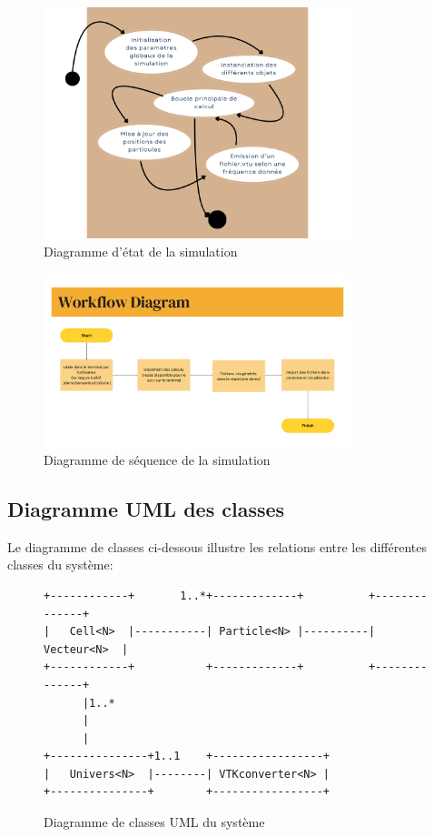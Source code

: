 \documentclass[12pt,a4paper]{article}
\begin{document}
\begin{figure}[H]
\centering
\includegraphics[width=0.8\textwidth]{assets/diagrammeEtatTransition.png}
\caption{Diagramme d'état de la simulation}
\end{figure}

\begin{figure}[H]
\centering
\includegraphics[width=0.8\textwidth]{assets/diagrammeSequence.png}
\caption{Diagramme de séquence de la simulation}
\end{figure}


\subsection{Diagramme UML des classes}

Le diagramme de classes ci-dessous illustre les relations entre les différentes classes du système:

\begin{figure}[H]
\centering
\begin{minipage}{\textwidth}
\begin{verbatim}
+------------+       1..*+-------------+          +--------------+
|   Cell<N>  |-----------| Particle<N> |----------|  Vecteur<N>  |
+------------+           +-------------+          +--------------+
      |1..*
      |
      |
+---------------+1..1    +-----------------+
|   Univers<N>  |--------| VTKconverter<N> |
+---------------+        +-----------------+
\end{verbatim}
\end{minipage}
\caption{Diagramme de classes UML du système}
\end{figure}
\end{document}
